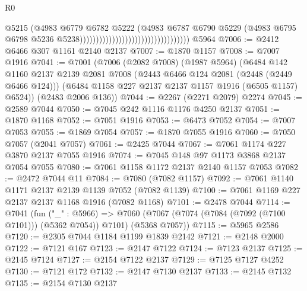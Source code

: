 \begin{lexlean}{R0}
\begin{coremodule}
                                                                  @5215
                                                                  (@4983
                                                                    @6779
                                                                    @6782
                                                                    @5222
                                                                    (@4983
                                                                      @6787
                                                                      @6790
                                                                      @5229
                                                                      (@4983
                                                                        @6795
                                                                        @6798
                                                                        @5236
                                                                        @5238))))))))))))))))))))))))))))))))))
    @5964
@7006 := @2412 @6466 @307 @1161 @2140 @2137
@7007 := @1870 @1157
@7008 := @7007 @1916
@7041 := @7001
    (@7006
      (@2082 @7008)
      (@1987 @5964)
      (@6484
        @142
        @1160
        @2137
        @2139
        @2081
        @7008
        (@2443 @6466 @124 @2081 (@2448 (@2449 @6466 @124)))
        (@6484 @1158 @227 @2137 @2137 @1157 @1916 (@6505 @1157) @6524))
      (@2483 @2006 @136))
@7044 := @2267 (@2271 @2079) @2274
@7045 := @2589 @7044
@7050 := @7045 @242 @1116 @1176 @4250 @2137
@7051 := @1870 @1168
@7052 := @7051 @1916
@7053 := @6473 @7052
@7054 := @7007 @7053
@7055 := @1869 @7054
@7057 := @1870 @7055 @1916
@7060 := @7050 @7057 (@2041 @7057)
@7061 := @2425 @7044
@7067 := @7061 @1174 @227 @3870 @2137 @7055 @1916
@7074 := @7045 @148 @97 @1173 @3868 @2137 @7054 @7055
@7080 := @7061 @1158 @1172 @2137 @2140 @1157 @7053
@7082 := @2472 @7044 @11
@7084 := @7080 (@7082 @1157)
@7092 := @7061 @1140 @1171 @2137 @2139 @1139 @7052 (@7082 @1139)
@7100 := @7061 @1169 @227 @2137 @2137 @1168 @1916 (@7082 @1168)
@7101 := @2478 @7044
@7114 := @7041
    (fun ("_" : @5966) =>
    @7060 (@7067 (@7074 (@7084 (@7092 (@7100 @7101))) (@5362 @7054)) @7101) (@5368 @7057))
@7115 := @5965 @2586
@7120 := @2305 @7044 @1184 @1199 @1839 @2142
@7121 := @2148 @2000
@7122 := @7121 @167
@7123 := @2147 @7122
@7124 := @7123 @2137
@7125 := @2145 @7124
@7127 := @2154 @7122 @2137
@7129 := @7125 @7127 @4252
@7130 := @7121 @172
@7132 := @2147 @7130 @2137
@7133 := @2145 @7132
@7135 := @2154 @7130 @2137

\end{coremodule}
\end{lexlean}
